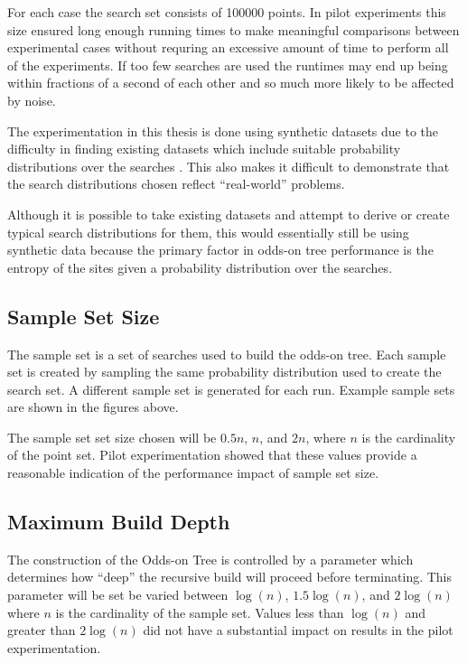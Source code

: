 \documentclass[mcs]{scsthesis}
\begin{document}
For each case the search set consists of 100000 points. In pilot experiments
this size ensured long enough running times to make meaningful comparisons
between experimental cases without requring an excessive amount of time to
perform all of the experiments. If too few searches are used the runtimes may
end up being within fractions of a second of each other and so much more likely
to be affected by noise.

The experimentation in this thesis is done using synthetic datasets due to the
difficulty in finding existing datasets which include suitable probability
distributions over the searches . This also makes it difficult to demonstrate
that the search distributions chosen reflect ``real-world'' problems.

Although it is possible to take existing datasets and attempt to derive or
create typical search distributions for them, this would essentially still be
using synthetic data because the primary factor in odds-on tree performance is
the entropy of the sites given a probability distribution over the searches.

\subsection{Sample Set Size}

The sample set is a set of searches used to build the odds-on tree. Each sample
set is created by sampling the same probability distribution used to create the
search set. A different sample set is generated for each run. Example sample
sets are shown in the figures above.

The sample set set size chosen will be $0.5n$, $n$, and $2n$, where
$n$ is the cardinality of the point set. Pilot experimentation showed that
these values provide a reasonable indication of the performance impact of
sample set size. 

\subsection{Maximum Build Depth}

The construction of the Odds-on Tree is controlled by a parameter which
determines how ``deep'' the recursive build will proceed before terminating.
This parameter will be set be varied between $\log(n)$, $1.5\log(n)$, and
$2\log(n)$ where $n$ is the cardinality of the sample set. Values less than
$\log(n)$ and greater than $2\log(n)$ did not have a substantial impact on
results in the pilot experimentation. 
\end{document}
